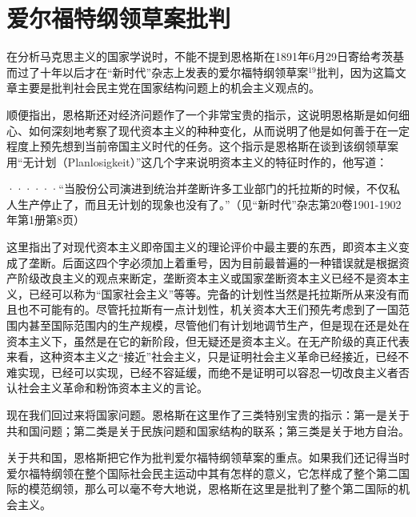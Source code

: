 \chapter{爱尔福特纲领草案批判} %

在分析马克思主义的国家学说时，不能不提到恩格斯在1891年6月29日寄给考茨基而过了十年以后才在“新时代”杂志上发表的爱尔福特纲领草案$^{19}$批判，因为这篇文章主要是批判社会民主党在{\kaishu 国家}结构问题上的{\kaishu 机会主义}观点的。

顺便指出，恩格斯还对经济问题作了一个非常宝贵的指示，这说明恩格斯是如何细心、如何深刻地考察了现代资本主义的种种变化，从而说明了他是如何善于在一定程度上预先想到当前帝国主义时代的任务。这个指示是恩格斯在谈到该纲领草案用“无计划（Planlosigkeit）”这几个字来说明资本主义的特征时作的，他写道：

\pskip
\small
\leftskip=10mm

······“当股份公司演进到统治并垄断许多工业部门的托拉斯的时候，不仅私人生产停止了，而且无计划的现象也没有了。”（见“新时代”杂志第20卷1901-1902年第1册第8页）

\normalsize
\leftskip=0mm
\pskip

这里指出了对现代资本主义即帝国主义的理论评价中最主要的东西，即资本主义变成了垄断。后面这四个字必须加上着重号，因为目前最普遍的一种错误就是根据资产阶级改良主义的观点来断定，垄断资本主义或国家垄断资本主义{\kaishu 已经不是}资本主义，已经可以称为“国家社会主义”等等。完备的计划性当然是托拉斯所从来没有而且也不可能有的。尽管托拉斯有一点计划性，机关资本大王们预先考虑到了一国范围内甚至国际范围内的生产规模，尽管他们有计划地调节生产，但是现在还是处在{\kaishu 资本主义}下，虽然是在它的新阶段，但无疑还是资本主义。在无产阶级的真正代表来看，这种资本主义之“接近”社会主义，只是证明社会主义革命已经接近，已经不难实现，已经可以实现，已经不容延缓，而绝不是证明可以容忍一切改良主义者否认社会主义革命和粉饰资本主义的言论。

现在我们回过来将国家问题。恩格斯在这里作了三类特别宝贵的指示：第一是关于共和国问题；第二类是关于民族问题和国家结构的联系；第三类是关于地方自治。

关于共和国，恩格斯把它作为批判爱尔福特纲领草案的重点。如果我们还记得当时爱尔福特纲领在整个国际社会民主运动中其有怎样的意义，它怎样成了整个第二国际的模范纲领，那么可以毫不夸大地说，恩格斯在这里是批判了整个第二国际的机会主义。

